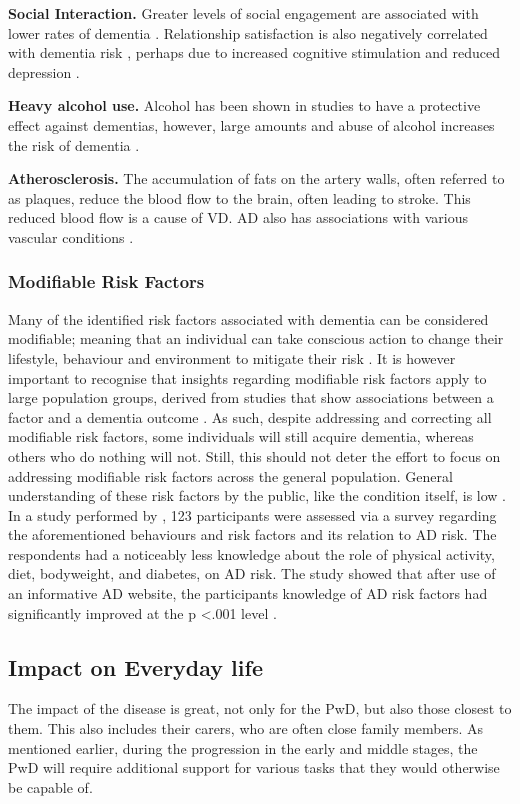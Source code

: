 \textbf{Social Interaction.}
Greater levels of social engagement are associated with lower rates of dementia \cite{Saczynski2006, Fratiglioni2000}. Relationship satisfaction is also negatively correlated with dementia risk \cite{Amieva2010}, perhaps due to increased cognitive stimulation and reduced depression \cite{Saczynski2010}.

\textbf{Heavy alcohol use.}
Alcohol has been shown in studies to have a protective effect against dementias, however, large amounts and abuse of alcohol increases the risk of dementia \cite{AlzheimerEurope2015}.

\textbf{Atherosclerosis.}
The accumulation of fats on the artery walls, often referred to as plaques, reduce the blood flow to the brain, often leading to stroke. This reduced blood flow is a cause of VD. AD also has associations with various vascular conditions \cite{Dolan2010}.

\subsubsection{Modifiable Risk Factors}
Many of the identified risk factors associated with dementia can be considered modifiable; meaning that an individual can take conscious action to change their lifestyle, behaviour and environment to mitigate their risk \cite{AlzheimersAssociation2015b}. It is however important to recognise that insights regarding modifiable risk factors apply to large population groups, derived from studies that show associations between a factor and a dementia outcome \cite{Baumgart2015}. As such, despite addressing and correcting all modifiable risk factors, some individuals will still acquire dementia, whereas others who do nothing will not. Still, this should not deter the effort to focus on addressing modifiable risk factors across the general population. General understanding of these risk factors by the public, like the condition itself, is low \cite{Farrow2013}. In a study performed by \cite{Farrow2013}, 123 participants were assessed via a survey regarding the aforementioned behaviours and risk factors and its relation to AD risk. The respondents had a noticeably less knowledge about the role of physical activity, diet, bodyweight, and diabetes, on AD risk. The study showed that after use of an informative AD website, the participants knowledge of AD risk factors had significantly improved at the p \textless .001 level \cite{Farrow2013}.

\subsection{Impact on Everyday life}
The impact of the disease is great, not only for the PwD, but also those closest to them. This also includes their carers, who are often close family members. As mentioned earlier, during the progression in the early and middle stages, the PwD will require additional support for various tasks that they would otherwise be capable of.

